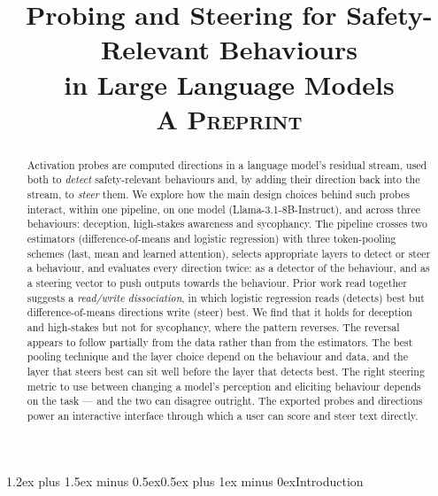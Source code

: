\documentclass[conference]{IEEEtran}
\makeatletter
\renewcommand{\section}{\@startsection{section}{1}{\z@}%
  {1.2ex plus 1.5ex minus 0.5ex}{0.5ex plus 1ex minus 0ex}{\normalfont\normalsize\centering\scshape}}
\makeatother
\begin{document}
\title{\fontsize{23.5}{28.2}\selectfont Probing and Steering for Safety-Relevant Behaviours\\ in Large Language Models\\[-1.75pt]{\normalsize\scshape A Preprint}\vspace{-4.25pt}}

\author{
\and
{}
}
\IEEEaftertitletext{\vspace{-14pt}}

\maketitle

\begin{abstract}
Activation probes are computed directions in a language model's residual stream, used
both to \emph{detect} safety-relevant behaviours and, by adding their direction
back into the stream, to \emph{steer} them. We explore how the main design
choices behind such probes interact, within one pipeline, on one model
(Llama-3.1-8B-Instruct), and across three behaviours: deception, high-stakes
awareness and sycophancy. The pipeline crosses two estimators (difference-of-means
and logistic regression) with three token-pooling schemes (last, mean and learned
attention), selects appropriate layers to detect or steer a behaviour, and
evaluates every direction twice: as a detector of the behaviour, and as a steering vector 
to push outputs towards the behaviour. Prior work read together suggests a \emph{read/write
dissociation}, in which logistic regression reads (detects) best but difference-of-means
directions write (steer) best. We find that it holds for deception and high-stakes but
not for sycophancy, where the pattern reverses. The reversal appears to follow partially from the data rather than from the
estimators. The
best pooling technique and the layer choice depend on the behaviour and data, and the layer that
steers best can sit well before the layer that detects best. The right
steering metric to use between changing a model's perception and eliciting behaviour depends on the task — and the two can
disagree outright. The exported probes and
directions power an interactive interface through which a user can score and
steer text directly.
\end{abstract}

\section{Introduction}
\end{document}
